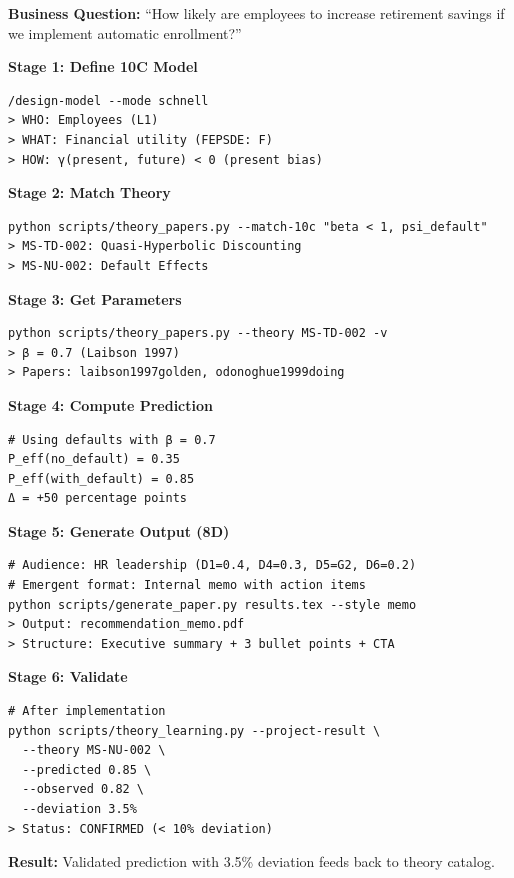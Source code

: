 \begin{tcolorbox}[colback=green!5!white, colframe=green!75!black,
    title=\textbf{Worked Example: Retirement Savings Intervention}]

\textbf{Business Question:} ``How likely are employees to increase retirement savings
if we implement automatic enrollment?''

\textbf{Stage 1: Define 10C Model}
\begin{verbatim}
/design-model --mode schnell
> WHO: Employees (L1)
> WHAT: Financial utility (FEPSDE: F)
> HOW: γ(present, future) < 0 (present bias)
\end{verbatim}

\textbf{Stage 2: Match Theory}
\begin{verbatim}
python scripts/theory_papers.py --match-10c "beta < 1, psi_default"
> MS-TD-002: Quasi-Hyperbolic Discounting
> MS-NU-002: Default Effects
\end{verbatim}

\textbf{Stage 3: Get Parameters}
\begin{verbatim}
python scripts/theory_papers.py --theory MS-TD-002 -v
> β = 0.7 (Laibson 1997)
> Papers: laibson1997golden, odonoghue1999doing
\end{verbatim}

\textbf{Stage 4: Compute Prediction}
\begin{verbatim}
# Using defaults with β = 0.7
P_eff(no_default) = 0.35
P_eff(with_default) = 0.85
Δ = +50 percentage points
\end{verbatim}

\textbf{Stage 5: Generate Output (8D)}
\begin{verbatim}
# Audience: HR leadership (D1=0.4, D4=0.3, D5=G2, D6=0.2)
# Emergent format: Internal memo with action items
python scripts/generate_paper.py results.tex --style memo
> Output: recommendation_memo.pdf
> Structure: Executive summary + 3 bullet points + CTA
\end{verbatim}

\textbf{Stage 6: Validate}
\begin{verbatim}
# After implementation
python scripts/theory_learning.py --project-result \
  --theory MS-NU-002 \
  --predicted 0.85 \
  --observed 0.82 \
  --deviation 3.5%
> Status: CONFIRMED (< 10% deviation)
\end{verbatim}

\textbf{Result:} Validated prediction with 3.5\% deviation feeds back to theory catalog.

\end{tcolorbox}

